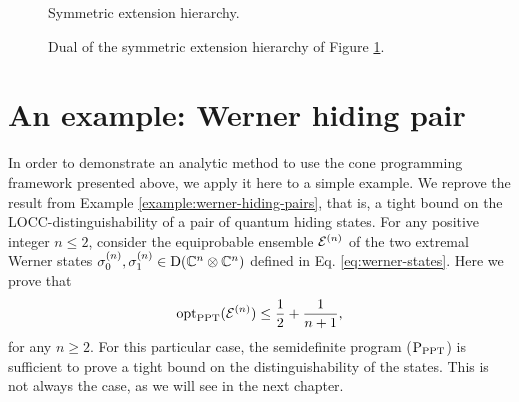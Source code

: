 \begin{figure}[!htbp]
  \centering
    \def\svgwidth{200pt}
    \scalebox{.85}{
    }
    \caption{Symmetric extension hierarchy.}
    \label{fig:symm-extension}
\end{figure}

\begin{figure}[!htbp]
  \centering
    \def\svgwidth{200pt}
    \scalebox{.85}{
    }
    \caption{Dual of the symmetric extension hierarchy of Figure \ref{fig:symm-extension}.}
    \label{fig:symm-extension-dual}
\end{figure}

\section{An example: Werner hiding pair}

In order to demonstrate an analytic method to use the cone programming framework
presented above, we apply it here to a simple example. 
We reprove the result from Example \ref{example:werner-hiding-pairs},
that is, a tight bound on the LOCC-distinguishability of a pair of quantum hiding states.
For any positive integer $n \leq 2$, consider the equiprobable ensemble $\mathcal{E}^{(n)}$ of 
the two extremal Werner states
$\sigma_{0}^{(n)}, \sigma_{1}^{(n)} \in \mathrm{D}(\mathbb{C}^{n}\otimes\mathbb{C}^{n})$
defined in Eq. \eqref{eq:werner-states}.
Here we prove that
\begin{equation}
  \operatorname{opt}_{\mathrm{PPT}}(\mathcal{E}^{(n)}) \leq \frac{1}{2} + \frac{1}{n+1},
\end{equation}
for any $n \geq 2$.
For this particular case, the semidefinite program ($\textup{P}_{\mathrm{PPT}}$) is 
sufficient to prove a tight bound on the distinguishability of the states.
This is not always the case, as we will see in the next chapter.

